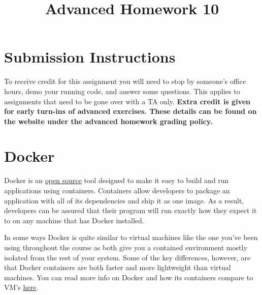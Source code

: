 \documentclass{article}
\begin{document}
\fancyfoot[C]{\color{gray} \thepage~/~\pageref*{LastPage}}
\pagestyle{fancyplain}

\title{\textbf{Advanced Homework 10\\}}
\author{\textbf{\color{red}{Due: Wednesday, November 21st, 11:59PM (Hard Deadline)}}}
\date{}
\maketitle


\section*{Submission Instructions}
To receive credit for this assignment you will need to stop by someone's
office hours, demo your running code, and answer some questions. \textbf{\color{red}{Make sure
to check the office hour schedule as the real due date is at the last office
hours before the date listed above.}} This applies to assignments that need to be gone over with a TA only.
\textbf{Extra credit is given for early turn-ins of advanced exercises. These details can be found on the website under the advanced homework grading policy.}

\medskip

\section*{Docker}

Docker is an \href{https://github.com/docker}{open source} tool designed to make it easy to build and run applications using containers. 
Containers allow developers to package an application with all of its dependencies and ship it as one image. As a result, developers can
be assured that their program will run exactly how they expect it to on any machine that has Docker installed.

In some ways Docker is quite similar to virtual machines like the one you've been using throughout the course as both give you a contained environment
mostly isolated from the rest of your system. Some of the key differences, however, are that Docker containers are both faster and more lightweight than
virtual machines. You can read more info on Docker and how its containers compare to VM's \href{https://docs.microsoft.com/en-us/dotnet/standard/microservices-architecture/container-docker-introduction/docker-defined}{here}.
\end{document}
